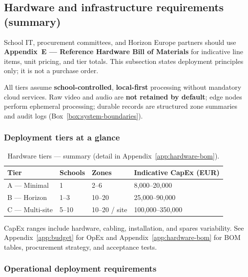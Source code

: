
\subsection{Hardware and infrastructure requirements (summary)}
\label{sec:hardware-procurement}

School IT, procurement committees, and Horizon Europe partners should use
\textbf{Appendix~E --- Reference Hardware Bill of Materials} for indicative line items, unit pricing,
and tier totals.
This subsection states deployment principles only; it is not a purchase order.

All tiers assume \textbf{school-controlled}, \textbf{local-first} processing without mandatory cloud
services.
Raw video and audio are \textbf{not retained by default}; edge nodes perform ephemeral processing;
durable records are structured zone summaries and audit logs (Box~\ref{box:system-boundaries}).

\subsubsection{Deployment tiers at a glance}

\begin{table}[htbp]
  \centering
  \caption{Hardware tiers --- summary (detail in Appendix~\ref{app:hardware-bom}).}
  \label{tab:hw-tier-summary}
  \small
  \begin{tabular}{@{}p{2.0cm}p{2.0cm}p{2.0cm}p{4.8cm}@{}}
    \toprule
    Tier & Schools & Zones & Indicative CapEx (EUR) \\
    \midrule
    A --- Minimal & 1 & 2--6 & 8{,}000--20{,}000 \\
    B --- Horizon & 1--3 & 10--20 & 25{,}000--90{,}000 \\
    C --- Multi-site & 5--10 & 10--20 / site & 100{,}000--350{,}000 \\
    \bottomrule
  \end{tabular}
\end{table}

\noindent CapEx ranges include hardware, cabling, installation, and spares variability.
See Appendix~\ref{app:budget} for OpEx and Appendix~\ref{app:hardware-bom} for BOM tables,
procurement strategy, and acceptance tests.

\subsubsection{Operational deployment requirements}

